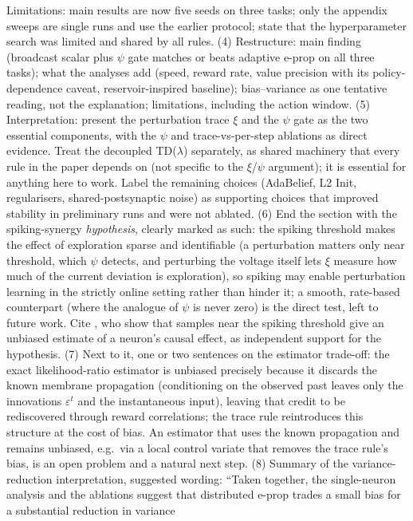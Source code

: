 \documentclass[10pt,twocolumn]{article}
\begin{document}
{Limitations: main results are now five seeds on three tasks; only the appendix
sweeps are single runs and use the earlier protocol; state that the
hyperparameter search was limited and shared by all rules. (4) Restructure:
main finding (broadcast scalar plus $\psi$ gate matches or beats adaptive
e-prop on all three tasks); what the analyses add (speed, reward rate, value
precision with its policy-dependence caveat, reservoir-inspired baseline);
bias--variance as one tentative reading, not the explanation; limitations,
including the action window. (5) Interpretation: present the perturbation trace $\xi$ and the $\psi$ gate as
the two essential components, with the $\psi$ and trace-vs-per-step ablations
as direct evidence. Treat the decoupled TD($\lambda$) separately, as shared
machinery that every rule in the paper depends on (not specific to the
$\xi$/$\psi$ argument); it is essential for anything here to work. Label the
remaining choices (AdaBelief, L2 Init, regularisers, shared-postsynaptic noise)
as supporting choices that improved stability in preliminary runs and were not
ablated. (6) End the
section with the spiking-synergy \emph{hypothesis}, clearly marked as such: the
spiking threshold makes the effect of exploration sparse and identifiable
(a perturbation matters only near threshold, which $\psi$ detects, and
perturbing the voltage itself lets $\xi$ measure how much of the current
deviation is exploration), so spiking may enable perturbation learning in the
strictly online setting rather than hinder it; a smooth, rate-based counterpart
(where the analogue of $\psi$ is never zero) is the direct test, left to
future work. Cite \citet{Lansdell2023}, who show that samples near the spiking
threshold give an unbiased estimate of a neuron's causal effect, as independent
support for the hypothesis. (7) Next to it, one or two sentences on the
estimator trade-off: the exact likelihood-ratio estimator is unbiased
precisely because it discards the known membrane propagation (conditioning on
the observed past leaves only the innovations $\varepsilon^t$ and the
instantaneous input), leaving that credit to be rediscovered through reward
correlations; the trace rule reintroduces this structure at the cost of bias.
An estimator that uses the known propagation and remains unbiased, e.g.\ via a
local control variate that removes the trace rule's bias, is an open problem
and a natural next step. (8) Summary of the variance-reduction interpretation, suggested wording:
``Taken together, the single-neuron analysis and the ablations suggest that
distributed e-prop trades a small bias for a substantial reduction in variance
}
\end{document}
